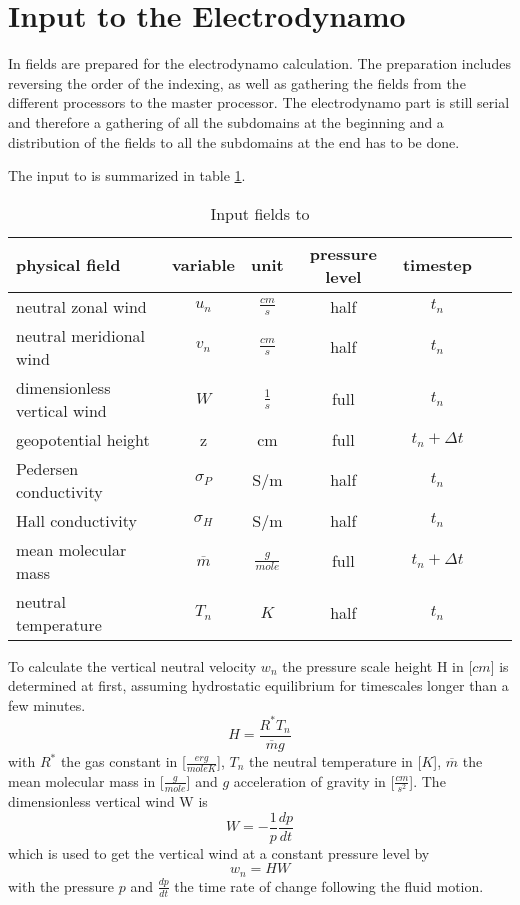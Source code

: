 \section{Input to the Electrodynamo}\label{cap:input2electro}
%
%
In  fields are prepared for the electrodynamo
calculation. The preparation includes reversing the order of the indexing, as
well as gathering the fields from the different processors to the master
processor. The electrodynamo part is still serial and therefore a gathering
of all the subdomains at
the beginning and
a distribution of the fields to all the subdomains at the end has to be done.

The input to  is summarized in table
\ref{tab:input_prepdynamo}.
%
\begin{table}[tb]
\begin{tabular}{|p{3.5cm} ||c|c|c|c|c|c|} \hline
physical field               & variable        & unit &pressure
level& timestep \\ \hline \hline
%
neutral zonal wind          & $u_n$           & $\frac{cm}{s}$   &half & $t_n$ \\
neutral meridional wind     & $v_n$           & $\frac{cm}{s}$   &half & $t_n$ \\
dimensionless vertical wind & $W$             & $\frac{1}{s}$    &full & $t_n$ \\
%
geopotential height         & z               & cm               &full & $t_{n}+ \Delta t$ \\
Pedersen conductivity     & $\sigma_{P}$      & S/m              &half & $t_n$\\
Hall conductivity       & $\sigma_{H}$    & S/m              &half & $t_n$ \\
mean molecular mass         & $\overline{m}$  & $\frac{g}{mole}$ &full & $t_{n}+ \Delta t$ \\
neutral temperature         & $T_n$           & $K$ &half & $t_n$  \\
\hline
\end{tabular}
\caption{Input fields to }
\label{tab:input_prepdynamo}
\end{table}
%
To calculate the vertical neutral velocity $w_n$ the pressure scale
height H in [$cm$] is determined at first, assuming hydrostatic
equilibrium for timescales longer than a few minutes.
%
\begin{equation}
    H = \frac{R^* T_n}{\overline{m}g}
\end{equation}
%
with $R^*$ the gas constant in [$\frac{erg}{mole K}$], $T_n$ the
neutral temperature in [$K$], $\overline{m}$ the mean molecular mass
in [$\frac{g}{mole}$] and $g$ acceleration of gravity in
[$\frac{cm}{s^2}$]. The dimensionless vertical wind W is
%
\begin{equation}
    W = -\frac{1}{p} \frac{dp}{dt}
\end{equation}
%
which is used to get the vertical wind at a constant pressure level
by
%
\begin{equation}
    w_n = H W
\end{equation}
%
with the pressure $p$ and $\frac{dp}{dt}$ the time rate of change following the fluid
motion.
